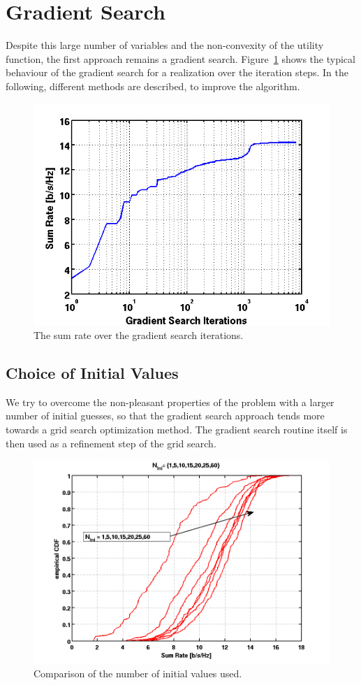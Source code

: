 \section{Gradient Search}
\label{sec:grads_solver}

Despite this large number of variables and the non-convexity of the utility function, the first approach remains a gradient search.
Figure~\ref{fig:grad_search} shows the typical behaviour of the gradient search for a realization over the iteration steps.
In the following, different methods are described, to improve the algorithm.

\begin{figure}
\centering
  \includegraphics[width=0.5\linewidth]{images/rvsgradCnt_7rel_18dB_6.png}
\caption{The sum rate over the gradient search iterations.}
\label{fig:grad_search}
\end{figure}


\subsection{Choice of Initial Values}
\label{sec:grads_ini}

We try to overcome the non-pleasant properties of the problem with a larger number of initial guesses, so that the gradient search approach tends more towards a grid search optimization method.
The gradient search routine itself is then used as a refinement step of the grid search.

\begin{figure}[hb]
\centering
  \includegraphics[width=0.6\linewidth]{images/Inicomparison_edited.png}
\caption{Comparison of the number of initial values used.}
\label{fig:ini_comp}
\end{figure}


